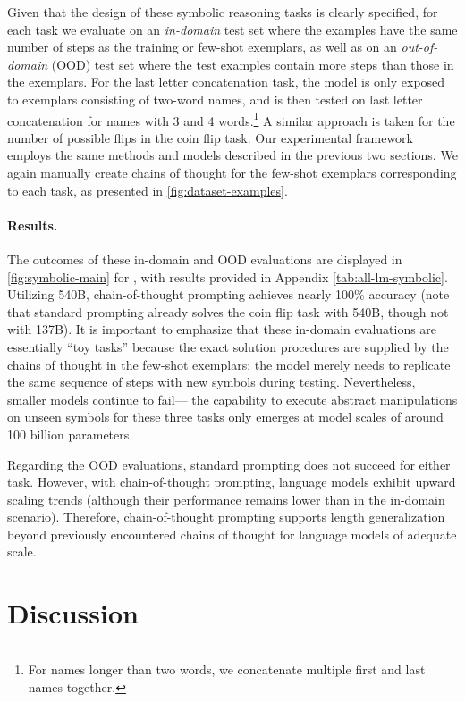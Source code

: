 Given that the design of these symbolic reasoning tasks is clearly specified, for each task we evaluate on an \textit{in-domain} test set where the examples have the same number of steps as the training or few-shot exemplars, as well as on an \textit{out-of-domain} (OOD) test set where the test examples contain more steps than those in the exemplars. For the last letter concatenation task, the model is only exposed to exemplars consisting of two-word names, and is then tested on last letter concatenation for names with 3 and 4 words.\footnote{For names longer than two words, we concatenate multiple first and last names together.} A similar approach is taken for the number of possible flips in the coin flip task. Our experimental framework employs the same methods and models described in the previous two sections. We again manually create chains of thought for the few-shot exemplars corresponding to each task, as presented in \cref{fig:dataset-examples}.

\paragraph{Results.} 
The outcomes of these in-domain and OOD evaluations are displayed in \cref{fig:symbolic-main} for \palm{}, with \lamda{} results provided in Appendix \cref{tab:all-lm-symbolic}. Utilizing \palm{} 540B, chain-of-thought prompting achieves nearly 100\% accuracy (note that standard prompting already solves the coin flip task with \palm{} 540B, though not with \lamda{} 137B). It is important to emphasize that these in-domain evaluations are essentially “toy tasks” because the exact solution procedures are supplied by the chains of thought in the few-shot exemplars; the model merely needs to replicate the same sequence of steps with new symbols during testing. Nevertheless, smaller models continue to fail— the capability to execute abstract manipulations on unseen symbols for these three tasks only emerges at model scales of around 100 billion parameters.

Regarding the OOD evaluations, standard prompting does not succeed for either task. However, with chain-of-thought prompting, language models exhibit upward scaling trends (although their performance remains lower than in the in-domain scenario). Therefore, chain-of-thought prompting supports length generalization beyond previously encountered chains of thought for language models of adequate scale.

\section{Discussion}\label{sec:discussion}

